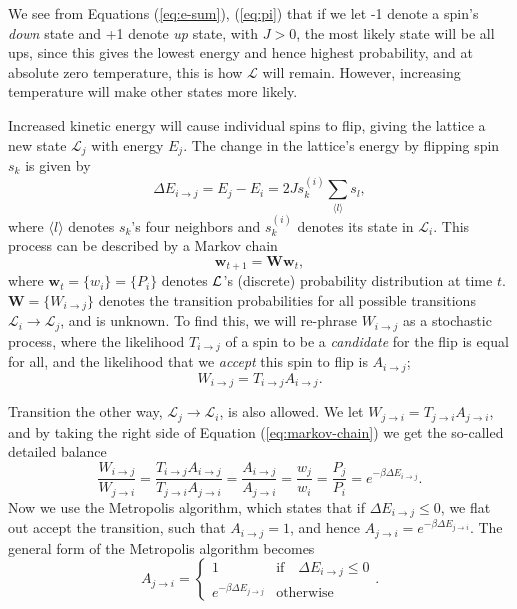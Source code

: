 \documentclass[]{article}
\begin{document}
We see from Equations (\ref{eq:e-sum}), (\ref{eq:pi}) that if we let -1 denote a spin's \textit{down} state and +1 denote \textit{up} state, with $J > 0$, the most likely state will be all ups, since this gives the lowest energy and hence highest probability, and at absolute zero temperature, this is how $\mathcal{L}$ will remain. However, increasing temperature will make other states more likely. 

Increased kinetic energy will cause individual spins to flip, giving the lattice a new state $\mathcal{L}_j$ with energy $E_j$. The change in the lattice's energy by flipping spin $s_k$ is given by 
\begin{equation}
	\Delta E_{i \rightarrow j} = E_j - E_i = 2J s_k^{(i)} \sum_{\langle l \rangle} s_l,
\end{equation}
where $\langle l \rangle$ denotes $s_k$'s four neighbors and $s_k^{(i)}$ denotes its state in $\mathcal{L}_i$. This process can be described by a Markov chain
\begin{equation} \label{eq:markov-chain}
	\mathbf{w}_{t+1} = \mathbf{W} \mathbf{w}_{t},
\end{equation}
where $\mathbf{w}_t = \{w_i\} = \{P_i\}$ denotes $\cal{L}$'s (discrete) probability distribution at time $t$. $\mathbf{W} = \{W_{i \rightarrow j}\}$ denotes the transition probabilities for all possible transitions $\mathcal{L}_i \rightarrow \mathcal{L}_j$, and is unknown. To find this, we will re-phrase $W_{i \rightarrow j}$ as a stochastic process, where the likelihood $T_{i \rightarrow j}$ of a spin to be a \textit{candidate} for the flip is equal for all, and the likelihood that we \textit{accept} this spin to flip is $A_{i \rightarrow j}$;
\begin{equation}
	W_{i \rightarrow j} = T_{i \rightarrow j} A_{i \rightarrow j}.
\end{equation}

Transition the other way, $\mathcal{L}_j \rightarrow \mathcal{L}_i$, is also allowed. We let $W_{j \rightarrow i} = T_{j \rightarrow i} A_{j \rightarrow i}$, and by taking the right side of Equation (\ref{eq:markov-chain}) we get the so-called detailed balance 
\begin{equation}
	\frac{W_{i \rightarrow j}}{W_{j \rightarrow i}} 
	= \frac{T_{i \rightarrow j} A_{i \rightarrow j}}{T_{j \rightarrow i} A_{j \rightarrow i}} 
	= \frac{A_{i \rightarrow j}}{A_{j \rightarrow i}}
	= \frac{w_j}{w_i} = \frac{P_j}{P_i} = e^{-\beta \Delta E_{i \rightarrow j}}.
\end{equation}
Now we use the Metropolis algorithm, which states that if $\Delta E_{i \rightarrow j} \le 0$, we flat out accept the transition, such that $A_{i \rightarrow j} = 1$, and hence $A_{j \rightarrow i} = e^{-\beta \Delta E_{j \rightarrow i}}$. The general form of the Metropolis algorithm becomes
\begin{equation}
	A_{j \rightarrow i} = 
	\begin{cases}
	1 &\text{if} \quad \Delta E_{i \rightarrow j} \le 0 \\
	e^{-\beta \Delta E_{j \rightarrow j}} &\text{otherwise}
	\end{cases}.
\end{equation}
\end{document}
